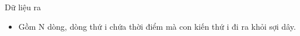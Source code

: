 Dữ liệu ra
\begin{itemize}
	\item Gồm N dòng, dòng thứ i chứa thời điểm mà con kiến thứ i đi ra khỏi sợi dây.
\end{itemize}